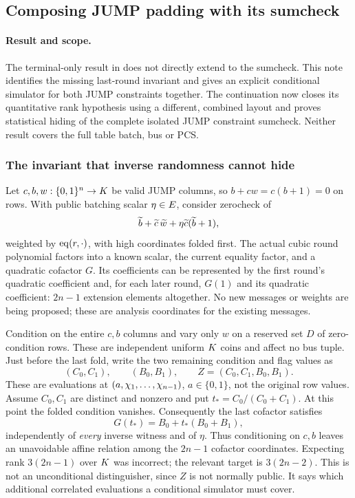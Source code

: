 \subsection{Composing JUMP padding with its sumcheck}\label{note:zk-jump-sumcheck}

\paragraph{Result and scope.} The terminal-only result in  does not directly extend to the sumcheck. This note identifies the missing last-round invariant and gives an explicit conditional simulator for both JUMP constraints together. The continuation  now closes its quantitative rank hypothesis using a different, combined layout and proves statistical hiding of the complete isolated JUMP constraint sumcheck. Neither result covers the full table batch, bus or PCS.

\subsubsection{The invariant that inverse randomness cannot hide}

Let $c,b,w:\{0,1\}^{n}\to K$ be valid JUMP columns, so $b+cw=c(b+1)=0$ on rows. With public batching scalar $\eta\in E$, consider zerocheck of
\[
 \widetilde{b}+\widetilde{c}\,\widetilde{w}+\eta\widetilde{c}(\widetilde{b}+1),
\]
weighted by $\operatorname{eq}(r,\cdot)$, with high coordinates folded first. The actual cubic round polynomial factors into a known scalar, the current equality factor, and a quadratic cofactor $G$. Its coefficients can be represented by the first round's quadratic coefficient and, for each later round, $G(1)$ and its quadratic coefficient: $2n-1$ extension elements altogether. No new messages or weights are being proposed; these are analysis coordinates for the existing messages.

Condition on the entire $c,b$ columns and vary only $w$ on a reserved set $D$ of zero-condition rows. These are independent uniform $K$ coins and affect no bus tuple. Just before the last fold, write the two remaining condition and flag values as
\[
 (C_0,C_1),\qquad (B_0,B_1),\qquad
 Z=(C_0,C_1,B_0,B_1).
\]
These are evaluations at $(a,\chi_1,\ldots,\chi_{n-1})$, $a\in\{0,1\}$, not the original row values. Assume $C_0,C_1$ are distinct and nonzero and put $t_*=C_0/(C_0+C_1)$. At this point the folded condition vanishes. Consequently the last cofactor satisfies
\begin{equation}\label{eq:jump-root}
 G(t_*)=B_0+t_*(B_0+B_1),
\end{equation}
independently of \emph{every} inverse witness and of $\eta$. Thus conditioning on $c,b$ leaves an unavoidable affine relation among the $2n-1$ cofactor coordinates. Expecting rank $3(2n-1)$ over $K$ was incorrect; the relevant target is $3(2n-2)$. This is not an unconditional distinguisher, since $Z$ is not normally public. It says which additional correlated evaluations a conditional simulator must cover.

